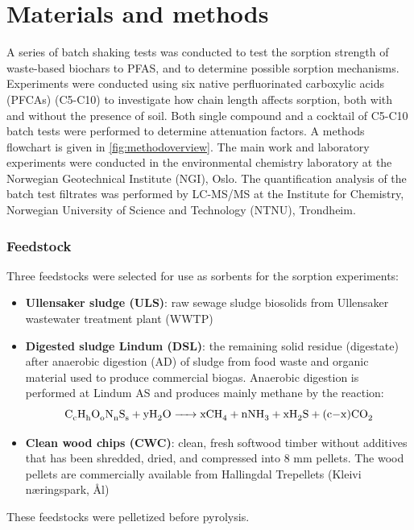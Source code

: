 \chapter{Materials and methods}\label{chap:MatlsMethds}
A series of batch shaking tests was conducted to test the sorption strength of waste-based biochars to PFAS, and to determine possible sorption mechanisms. Experiments were conducted using six native perfluorinated carboxylic acids (PFCAs) (C5-C10) to investigate how chain length affects sorption, both with and without the presence of soil. Both single compound and a cocktail of C5-C10 batch tests were performed to determine attenuation factors. A methods flowchart is given in \cref{fig:methodoverview}. The main work and laboratory experiments were conducted in the environmental chemistry laboratory at the Norwegian Geotechnical Institute (NGI), Oslo. The quantification analysis of the batch test filtrates was performed by LC-MS/MS at the Institute for Chemistry, Norwegian University of Science and Technology (NTNU), Trondheim. 

\subsection{Feedstock}
Three feedstocks were selected for use as sorbents for the sorption experiments:

\begin{itemize}
    \item \textbf{Ullensaker sludge (ULS)}: raw sewage sludge biosolids from Ullensaker wastewater treatment plant (WWTP)
    \item \textbf{Digested sludge Lindum (DSL)}: the remaining solid residue (digestate) after anaerobic digestion (AD) of sludge from food waste and organic material used to produce commercial biogas. Anaerobic digestion is performed at Lindum AS and produces mainly methane by the reaction: 
        \begin{equation}
        \label{eq:AD}
            \ce{C_cH_hO_oN_nS_s + yH_2O -> xCH_4 + nNH_3 + xH_2S + (c-x)CO_2}
        \end{equation}
    \item \textbf{Clean wood chips (CWC)}: clean, fresh softwood timber without additives that has been shredded, dried, and compressed into 8 mm pellets. The wood pellets are commercially available from Hallingdal Trepellets (Kleivi næringspark, Ål)
\end{itemize}

These feedstocks were pelletized before pyrolysis.

